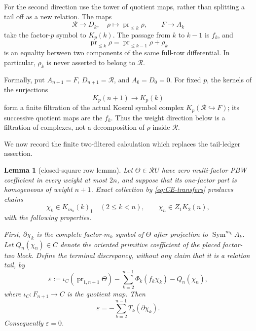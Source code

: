 \documentclass[11pt]{amsart}
\newtheorem{lemma}[theorem]{Lemma}
\theoremstyle{remark}
\newcommand{\Sym}{\operatorname{Sym}}
\newcommand{\Rel}{\mathcal R}
\newcommand{\pr}{\operatorname{pr}}
\begin{document}
For the second direction use the tower of quotient maps, rather than
splitting a tail off as a new relation.  The maps
\[
 \Rel\longrightarrow D_k,\quad \rho\longmapsto\pr_{\leq k}\rho,
 \qquad F\longrightarrow A_k
\]
take the factor-$p$ symbol to $K_p(k)$.  The passage from $k$ to $k-1$
is $f_k$, and
\begin{equation}\label{eq:successive-weight-differential}
 \pr_{\leq k}\rho=\pr_{\leq k-1}\rho+\rho_k
\end{equation}
is an equality between two components of the same full-row
differential.  In particular, $\rho_k$ is never asserted to belong to
$\Rel$.

Formally, put $A_{n+1}=F$, $D_{n+1}=\Rel$, and $A_0=D_0=0$.
For fixed $p$, the kernels of the surjections
\[
 K_p(n+1)\longrightarrow K_p(k)
\]
form a finite filtration of the actual Koszul symbol complex
$K_p(\Rel\hookrightarrow F)$; its successive quotient maps are the
$f_k$.  Thus the weight direction below is a filtration of complexes,
not a decomposition of $\rho$ inside $\Rel$.

We now record the finite two-filtered calculation which replaces the
tail-ledger assertion.

\begin{lemma}[closed-square row lemma]\label{lem:closed-square}
Let $\Theta\in\Rel U$ have zero multi-factor PBW coefficient in every
weight at most $2n$, and suppose that its one-factor part is homogeneous
of weight $n+1$.  Exact collection by \eqref{eq:CE-transfers} produces
chains
\begin{equation}\label{eq:packet-chains}
 \chi_k\in K_{m_k}(k)_1\quad(2\leq k<n),
 \qquad \chi_n\in Z_1K_2(n),
\end{equation}
with the following properties.

First, $\partial\chi_k$ is the complete factor-$m_k$ symbol of
$\Theta$ after projection to $\Sym^{m_k}A_k$.  Let
$Q_n(\chi_n)\in C$ denote the oriented primitive coefficient of the
placed factor-two block.  Define the terminal discrepancy, without any
claim that it is a relation tail, by
\begin{equation}\label{eq:terminal-definition}
 \varepsilon:=\iota_C(\pr_{1,n+1}\Theta)
 -\sum_{k=2}^{n-1}\Phi_k(f_k\chi_k)-Q_n(\chi_n),
\end{equation}
where $\iota_C:F_{n+1}\to C$ is the quotient map.  Then
\begin{equation}\label{eq:terminal-discrepancy}
 \varepsilon=-\sum_{k=2}^{n-1}T_k(\partial\chi_k).
\end{equation}
Consequently $\varepsilon=0$.
\end{lemma}
\end{document}
